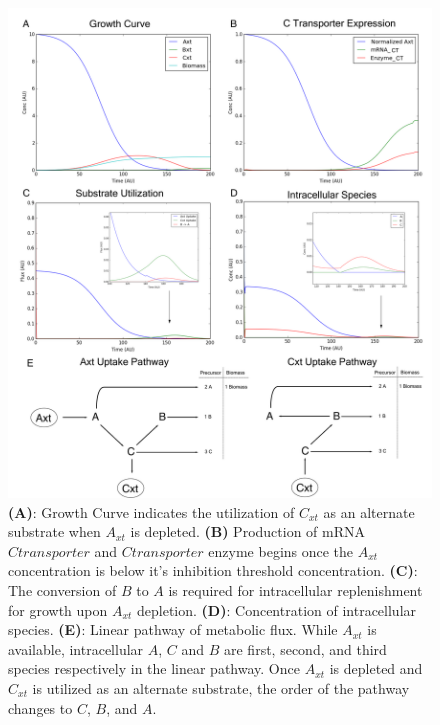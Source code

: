 \documentclass[12pt]{article}
\begin{document}
\clearpage
\begin{figure}[h]
\centering
\includegraphics[width=1.0\textwidth]{./Figures/Figure3_POC_Growth.pdf}
\caption{\textbf{(A)}: Growth Curve indicates the utilization of $C_{xt}$ as an alternate substrate when $A_{xt}$ is depleted. \textbf{(B)} Production of mRNA $C transporter$ and $C transporter$ enzyme begins once the $A_{xt}$ concentration is below it’s inhibition threshold concentration. \textbf{(C)}: The conversion of $B$ to $A$ is required for intracellular replenishment for growth upon $A_{xt}$ depletion. \textbf{(D)}: Concentration of intracellular species. \textbf{(E)}: Linear pathway of metabolic flux. While $A_{xt}$ is available, intracellular $A$, $C$ and $B$ are first, second, and third species respectively in the linear pathway. Once $A_{xt}$ is depleted and $C_{xt}$ is utilized as an alternate substrate, the order of the pathway changes to $C$, $B$, and $A$.
}\label{fig3-growth}
\end{figure}
\end{document}
